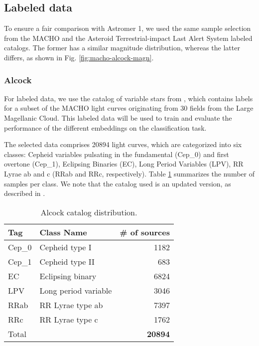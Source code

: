 \subsection{Labeled data}
To ensure a fair comparison with Astromer 1, we used the same sample selection from the MACHO \citep[hereafter referred to as Alcock; ][]{Alcock2001Variable} and the  Asteroid Terrestrial-impact Last Alert System \citep[hereafter referred to as ATLAS; ][]{heinze2018first} labeled catalogs. The former has a similar magnitude distribution, whereas the latter differs, as shown in Fig. \ref{fig:macho-alcock-magn}.

\subsubsection{Alcock}
For labeled data, we use the catalog of variable stars from \citet{Alcock2001Variable}, which contains labels for a subset of the MACHO light curves originating from 30 fields from the Large Magellanic Cloud. This labeled data will be used to train and evaluate the performance of the different embeddings on the classification task. 

The selected data comprises \num{20894} light curves, which are categorized into six classes: Cepheid variables pulsating in the fundamental (Cep\_0) and first overtone (Cep\_1), Eclipsing Binaries (EC), Long Period Variables (LPV), RR Lyrae ab and c (RRab and RRc, respectively). Table \ref{tab:alcock} summarizes the number of samples per class. We note that the catalog used is an updated version, as described in \cite{astromer}.

\begin{table}
\caption{Alcock catalog distribution.}              
\label{tab:alcock}  
\centering 
\begin{tabular}{l l r} 
\hline\hline         
Tag & Class Name & \# of sources \\ \hline
 Cep\_0 & Cepheid type I &\num{1182} \\
 Cep\_1 &Cepheid type II & \num{683} \\
 EC &Eclipsing binary & \num{6824} \\
 LPV &Long period variable &  \num{3046} \\
 RRab &RR Lyrae type ab  &  \num{7397} \\
 RRc &RR Lyrae type c &  \num{1762} \\
 Total & & \textbf{\num{20894}} \\
\hline                            
\end{tabular}
\end{table}

